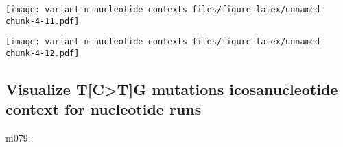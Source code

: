 \documentclass[]{article}
\newenvironment{Shaded}{\begin{snugshade}}{\end{snugshade}}
\newcommand{\DataTypeTok}[1]{\textcolor[rgb]{0.13,0.29,0.53}{#1}}
\newcommand{\DecValTok}[1]{\textcolor[rgb]{0.00,0.00,0.81}{#1}}
\newcommand{\KeywordTok}[1]{\textcolor[rgb]{0.13,0.29,0.53}{\textbf{#1}}}
\newcommand{\NormalTok}[1]{#1}
\newcommand{\OperatorTok}[1]{\textcolor[rgb]{0.81,0.36,0.00}{\textbf{#1}}}
\newcommand{\StringTok}[1]{\textcolor[rgb]{0.31,0.60,0.02}{#1}}
\begin{document}
\texttt{[image: variant-n-nucleotide-contexts\_files/figure-latex/unnamed-chunk-4-11.pdf]}

\begin{Shaded}
\end{Shaded}

\texttt{[image: variant-n-nucleotide-contexts\_files/figure-latex/unnamed-chunk-4-12.pdf]}

\hypertarget{visualize-tctg-mutations-icosanucleotide-context-for-nucleotide-runs}{%
\subsection{Visualize T{[}C\textgreater T{]}G mutations icosanucleotide
context for nucleotide
runs}\label{visualize-tctg-mutations-icosanucleotide-context-for-nucleotide-runs}}

m079:
\end{document}
